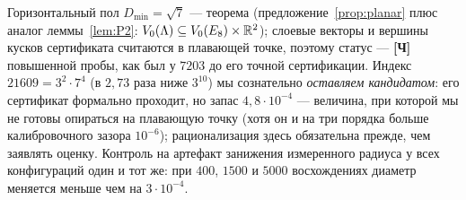 Горизонтальный пол $D_{\min}=\sqrt7$ --- теорема (предложение~\ref{prop:planar}
плюс аналог леммы~\ref{lem:P2}: $V_0(\Lambda)\subseteq V_0(E_8)\times\mathbb{R}^2$);
слоевые векторы и вершины кусков сертификата считаются в плавающей точке,
поэтому статус --- \textbf{[Ч]} повышенной пробы, как был у $7203$ до его
точной сертификации. Индекс
$21609=3^2\cdot7^4$ (в $2{,}73$ раза ниже $3^{10}$) мы сознательно
\emph{оставляем кандидатом}: его сертификат формально проходит, но запас
$4{,}8\cdot10^{-4}$ --- величина, при которой мы не готовы опираться на
плавающую точку (хотя он и на три порядка больше калибровочного зазора
$10^{-6}$); рационализация здесь обязательна прежде, чем заявлять оценку.
Контроль на артефакт занижения измеренного радиуса у всех конфигураций один и
тот же: при $400$, $1500$ и $5000$ восхождениях диаметр меняется меньше чем на
$3\cdot10^{-4}$.
